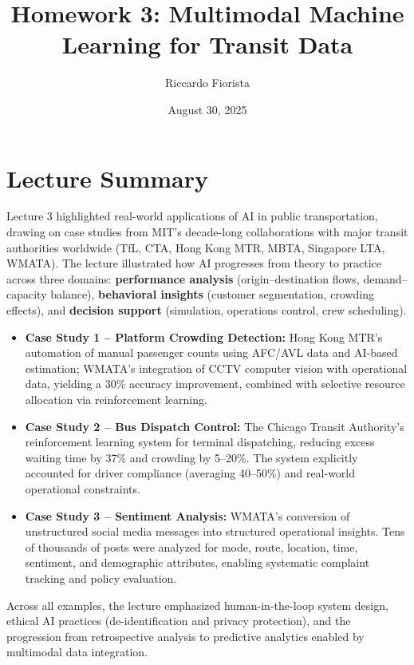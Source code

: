 \documentclass[11pt]{article}
\title{Homework 3: Multimodal Machine Learning for Transit Data}
\author{Riccardo Fiorista}
\date{August 30, 2025}
\begin{document}
\maketitle

\section*{Lecture Summary}

Lecture 3 highlighted real-world applications of AI in public transportation, drawing on case studies from MIT’s decade-long collaborations with major transit authorities worldwide (TfL, CTA, Hong Kong MTR, MBTA, Singapore LTA, WMATA). The lecture illustrated how AI progresses from theory to practice across three domains:  
\textbf{performance analysis} (origin–destination flows, demand–capacity balance),  
\textbf{behavioral insights} (customer segmentation, crowding effects), and  
\textbf{decision support} (simulation, operations control, crew scheduling).

\begin{itemize}
    \item \textbf{Case Study 1 – Platform Crowding Detection:} Hong Kong MTR’s automation of manual passenger counts using AFC/AVL data and AI-based estimation; WMATA’s integration of CCTV computer vision with operational data, yielding a 30\% accuracy improvement, combined with selective resource allocation via reinforcement learning.

    \item \textbf{Case Study 2 – Bus Dispatch Control:} The Chicago Transit Authority’s reinforcement learning system for terminal dispatching, reducing excess waiting time by 37\% and crowding by 5–20\%. The system explicitly accounted for driver compliance (averaging 40–50\%) and real-world operational constraints.

    \item \textbf{Case Study 3 – Sentiment Analysis:} WMATA’s conversion of unstructured social media messages into structured operational insights. Tens of thousands of posts were analyzed for mode, route, location, time, sentiment, and demographic attributes, enabling systematic complaint tracking and policy evaluation.
\end{itemize}

Across all examples, the lecture emphasized human-in-the-loop system design, ethical AI practices (de-identification and privacy protection), and the progression from retrospective analysis to predictive analytics enabled by multimodal data integration.
\end{document}
